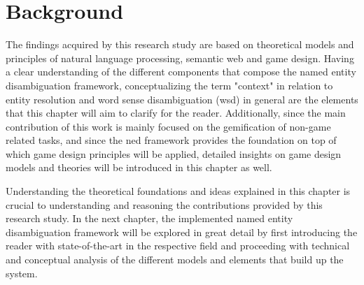 \chapter{Background}
\label{chap:background}

The findings acquired by this research study are based on theoretical models and principles of natural language processing, semantic web and game design. Having a clear understanding of the different components that compose the named entity disambiguation framework, conceptualizing the term "context" in relation to entity resolution and word sense disambiguation (\ac{wsd}) in general are the elements that this chapter will aim to clarify for the reader. Additionally, since the main contribution of this work is mainly focused on the gemification of non-game related tasks, and since the \ac{ned} framework provides the foundation on top of which game design principles will be applied, detailed insights on game design models and theories will be introduced in this chapter as well.   






Understanding the theoretical foundations and ideas explained in this chapter is crucial to understanding and reasoning the contributions provided by this research study. In the next chapter, the implemented named entity disambiguation framework will be explored in great detail by first introducing the reader with state-of-the-art in the respective field and proceeding with technical and conceptual analysis of the different models and elements that build up the system.  